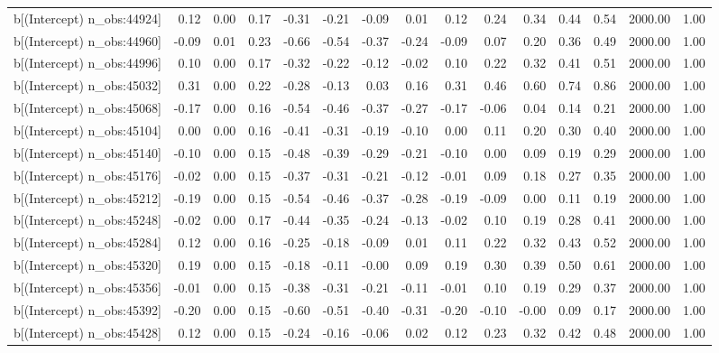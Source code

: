 \begin{table}[ht]
\begin{tabular}{rrrrrrrrrrrrrrr}
  b[(Intercept) n\_obs:44924] & 0.12 & 0.00 & 0.17 & -0.31 & -0.21 & -0.09 & 0.01 & 0.12 & 0.24 & 0.34 & 0.44 & 0.54 & 2000.00 & 1.00 \\ 
  b[(Intercept) n\_obs:44960] & -0.09 & 0.01 & 0.23 & -0.66 & -0.54 & -0.37 & -0.24 & -0.09 & 0.07 & 0.20 & 0.36 & 0.49 & 2000.00 & 1.00 \\ 
  b[(Intercept) n\_obs:44996] & 0.10 & 0.00 & 0.17 & -0.32 & -0.22 & -0.12 & -0.02 & 0.10 & 0.22 & 0.32 & 0.41 & 0.51 & 2000.00 & 1.00 \\ 
  b[(Intercept) n\_obs:45032] & 0.31 & 0.00 & 0.22 & -0.28 & -0.13 & 0.03 & 0.16 & 0.31 & 0.46 & 0.60 & 0.74 & 0.86 & 2000.00 & 1.00 \\ 
  b[(Intercept) n\_obs:45068] & -0.17 & 0.00 & 0.16 & -0.54 & -0.46 & -0.37 & -0.27 & -0.17 & -0.06 & 0.04 & 0.14 & 0.21 & 2000.00 & 1.00 \\ 
  b[(Intercept) n\_obs:45104] & 0.00 & 0.00 & 0.16 & -0.41 & -0.31 & -0.19 & -0.10 & 0.00 & 0.11 & 0.20 & 0.30 & 0.40 & 2000.00 & 1.00 \\ 
  b[(Intercept) n\_obs:45140] & -0.10 & 0.00 & 0.15 & -0.48 & -0.39 & -0.29 & -0.21 & -0.10 & 0.00 & 0.09 & 0.19 & 0.29 & 2000.00 & 1.00 \\ 
  b[(Intercept) n\_obs:45176] & -0.02 & 0.00 & 0.15 & -0.37 & -0.31 & -0.21 & -0.12 & -0.01 & 0.09 & 0.18 & 0.27 & 0.35 & 2000.00 & 1.00 \\ 
  b[(Intercept) n\_obs:45212] & -0.19 & 0.00 & 0.15 & -0.54 & -0.46 & -0.37 & -0.28 & -0.19 & -0.09 & 0.00 & 0.11 & 0.19 & 2000.00 & 1.00 \\ 
  b[(Intercept) n\_obs:45248] & -0.02 & 0.00 & 0.17 & -0.44 & -0.35 & -0.24 & -0.13 & -0.02 & 0.10 & 0.19 & 0.28 & 0.41 & 2000.00 & 1.00 \\ 
  b[(Intercept) n\_obs:45284] & 0.12 & 0.00 & 0.16 & -0.25 & -0.18 & -0.09 & 0.01 & 0.11 & 0.22 & 0.32 & 0.43 & 0.52 & 2000.00 & 1.00 \\ 
  b[(Intercept) n\_obs:45320] & 0.19 & 0.00 & 0.15 & -0.18 & -0.11 & -0.00 & 0.09 & 0.19 & 0.30 & 0.39 & 0.50 & 0.61 & 2000.00 & 1.00 \\ 
  b[(Intercept) n\_obs:45356] & -0.01 & 0.00 & 0.15 & -0.38 & -0.31 & -0.21 & -0.11 & -0.01 & 0.10 & 0.19 & 0.29 & 0.37 & 2000.00 & 1.00 \\ 
  b[(Intercept) n\_obs:45392] & -0.20 & 0.00 & 0.15 & -0.60 & -0.51 & -0.40 & -0.31 & -0.20 & -0.10 & -0.00 & 0.09 & 0.17 & 2000.00 & 1.00 \\ 
  b[(Intercept) n\_obs:45428] & 0.12 & 0.00 & 0.15 & -0.24 & -0.16 & -0.06 & 0.02 & 0.12 & 0.23 & 0.32 & 0.42 & 0.48 & 2000.00 & 1.00 \\ 

\end{tabular}
\end{table}

